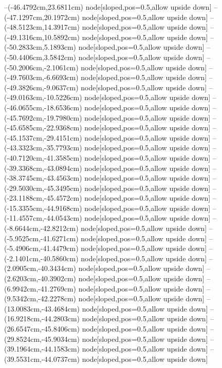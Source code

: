 --(-46.4792cm,23.6811cm) node[sloped,pos=0.5,allow upside down]{\ArrowIn}
--(-47.1297cm,20.1972cm) node[sloped,pos=0.5,allow upside down]{\ArrowIn}
--(-48.5123cm,14.3917cm) node[sloped,pos=0.5,allow upside down]{\ArrowIn}
--(-49.1316cm,10.5892cm) node[sloped,pos=0.5,allow upside down]{\ArrowIn}
--(-50.2833cm,5.1893cm) node[sloped,pos=0.5,allow upside down]{\ArrowIn}
--(-50.4406cm,3.5842cm) node[sloped,pos=0.5,allow upside down]{\ArrowIn}
--(-50.2006cm,-2.1061cm) node[sloped,pos=0.5,allow upside down]{\ArrowIn}
--(-49.7603cm,-6.6693cm) node[sloped,pos=0.5,allow upside down]{\ArrowIn}
--(-49.3826cm,-9.0637cm) node[sloped,pos=0.5,allow upside down]{\ArrowIn}
--(-49.0163cm,-10.5226cm) node[sloped,pos=0.5,allow upside down]{\ArrowIn}
--(-46.0655cm,-18.6536cm) node[sloped,pos=0.5,allow upside down]{\ArrowIn}
--(-45.7692cm,-19.7980cm) node[sloped,pos=0.5,allow upside down]{\ArrowIn}
--(-45.6585cm,-22.9368cm) node[sloped,pos=0.5,allow upside down]{\ArrowIn}
--(-45.1537cm,-29.4151cm) node[sloped,pos=0.5,allow upside down]{\ArrowIn}
--(-43.3323cm,-35.7793cm) node[sloped,pos=0.5,allow upside down]{\ArrowIn}
--(-40.7120cm,-41.3585cm) node[sloped,pos=0.5,allow upside down]{\ArrowIn}
--(-39.3368cm,-43.0894cm) node[sloped,pos=0.5,allow upside down]{\ArrowIn}
--(-38.3745cm,-43.4563cm) node[sloped,pos=0.5,allow upside down]{\ArrowIn}
--(-29.5030cm,-45.3495cm) node[sloped,pos=0.5,allow upside down]{\ArrowIn}
--(-23.1188cm,-45.4572cm) node[sloped,pos=0.5,allow upside down]{\ArrowIn}
--(-15.3355cm,-44.9168cm) node[sloped,pos=0.5,allow upside down]{\ArrowIn}
--(-11.4557cm,-44.0543cm) node[sloped,pos=0.5,allow upside down]{\ArrowIn}
--(-8.6644cm,-42.8212cm) node[sloped,pos=0.5,allow upside down]{\ArrowIn}
--(-5.9525cm,-41.6271cm) node[sloped,pos=0.5,allow upside down]{\ArrowIn}
--(-5.4906cm,-41.4479cm) node[sloped,pos=0.5,allow upside down]{\arrowIn}
--(-2.1401cm,-40.5860cm) node[sloped,pos=0.5,allow upside down]{\ArrowIn}
--(2.0905cm,-40.3434cm) node[sloped,pos=0.5,allow upside down]{\ArrowIn}
--(2.6203cm,-40.3902cm) node[sloped,pos=0.5,allow upside down]{\arrowIn}
--(6.9942cm,-41.2769cm) node[sloped,pos=0.5,allow upside down]{\ArrowIn}
--(9.5342cm,-42.2278cm) node[sloped,pos=0.5,allow upside down]{\ArrowIn}
--(13.0083cm,-43.4684cm) node[sloped,pos=0.5,allow upside down]{\ArrowIn}
--(16.9218cm,-44.2803cm) node[sloped,pos=0.5,allow upside down]{\ArrowIn}
--(26.6547cm,-45.8406cm) node[sloped,pos=0.5,allow upside down]{\ArrowIn}
--(29.8524cm,-45.9034cm) node[sloped,pos=0.5,allow upside down]{\ArrowIn}
--(39.1964cm,-44.1583cm) node[sloped,pos=0.5,allow upside down]{\ArrowIn}
--(39.5531cm,-44.0737cm) node[sloped,pos=0.5,allow upside down]{\arrowIn}
